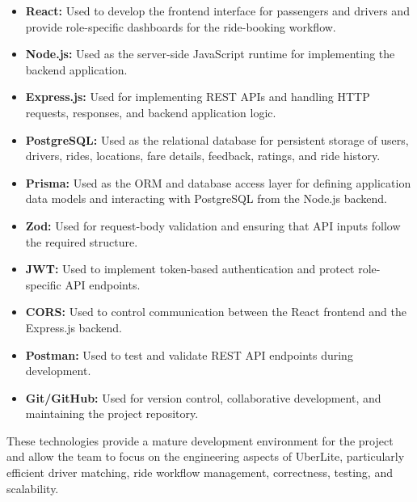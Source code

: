 \documentclass[11pt,a4paper]{article}
\begin{document}
\begin{itemize}

    \item \textbf{React:} Used to develop the frontend interface for
    passengers and drivers and provide role-specific dashboards for
    the ride-booking workflow.

    \item \textbf{Node.js:} Used as the server-side JavaScript
    runtime for implementing the backend application.

    \item \textbf{Express.js:} Used for implementing REST APIs and
    handling HTTP requests, responses, and backend application logic.

    \item \textbf{PostgreSQL:} Used as the relational database for
    persistent storage of users, drivers, rides, locations, fare
    details, feedback, ratings, and ride history.

    \item \textbf{Prisma:} Used as the ORM and database access layer
    for defining application data models and interacting with
    PostgreSQL from the Node.js backend.

    \item \textbf{Zod:} Used for request-body validation and ensuring
    that API inputs follow the required structure.

    \item \textbf{JWT:} Used to implement token-based authentication
    and protect role-specific API endpoints.

    \item \textbf{CORS:} Used to control communication between the
    React frontend and the Express.js backend.

    \item \textbf{Postman:} Used to test and validate REST API
    endpoints during development.

    \item \textbf{Git/GitHub:} Used for version control,
    collaborative development, and maintaining the project
    repository.

\end{itemize}

These technologies provide a mature development environment for the
project and allow the team to focus on the engineering aspects of
UberLite, particularly efficient driver matching, ride workflow
management, correctness, testing, and scalability.
\end{document}
